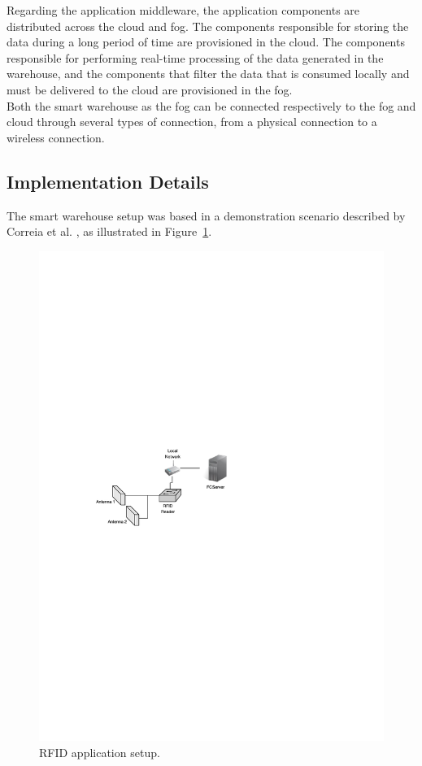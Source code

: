 Regarding the application middleware, the application components are distributed across the cloud and
fog. The components responsible for storing the data during a long period of time are provisioned in
the cloud. The components responsible for performing real-time processing of the data generated in the
warehouse, and the components that filter the data that is consumed locally and must be delivered to
the cloud are provisioned in the fog.\\

Both the smart warehouse as the fog can be connected respectively to the fog and cloud through
several types of connection, from a physical connection to a wireless connection.

\subsection{Implementation Details}
\label{sub:implementation}
The smart warehouse setup was based in a demonstration scenario described by Correia et al. \cite{correiaalpharfid},
as illustrated in Figure~\ref{fig:rfidapp_setup}.\\

\begin{figure}[ht!]
\centering
\includegraphics[width=.6\textwidth]{./images/rfidapp_setup}
\caption[RFID application setup.]{RFID application setup.}
\label{fig:rfidapp_setup}
\end{figure}

